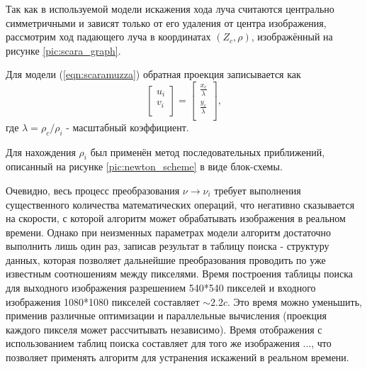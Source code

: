 Так как в используемой модели искажения хода луча считаются центрально симметричными и зависят только от его удаления от центра изображения, 
рассмотрим ход падающего луча в координатах $(Z_c, \rho)$, изображённый на рисунке \ref{pic:scara_graph}.


Для модели (\ref{eqn:scaramuzza}) обратная проекция записывается как 
\begin{equation}
    \label{eq:back_scara}
    \left[\begin{matrix}u_i\\v_i\\\end{matrix}\right] = \left[\begin{matrix} \frac{x_c}{\lambda}  \\  \frac{y_c}{\lambda} \\\end{matrix}\right],
\end{equation}  
где $\lambda = \rho_c / \rho_i$ - масштабный коэффициент. 

Для нахождения $\rho_i$ был применён метод последовательных приближений, описанный на рисунке \ref{pic:newton_scheme}  в виде блок-схемы. 


Очевидно, весь процесс преобразования $\nu \rightarrow \nu_i$ требует выполнения существенного количества математических операций, что 
негативно сказывается на скорости, с которой алгоритм может обрабатывать изображения в реальном времени. Однако при неизменных параметрах 
модели алгоритм достаточно выполнить лишь один раз, записав результат в таблицу поиска - структуру данных, которая позволяет дальнейшие 
преобразования проводить по уже известным соотношениям между пикселями. Время построения таблицы поиска для выходного изображения 
разрешением 540*540 пикселей и входного изображения 1080*1080 пикселей составляет $\sim 2.2c$. %
Это время можно уменьшить, применив различные оптимизации и параллельные вычисления (проекция каждого пикселя может рассчитывать независимо). %
Время отображения с использованием таблиц поиска составляет для того же изображения $ ... $, что позволяет применять алгоритм для устранения 
искажений в реальном времени.